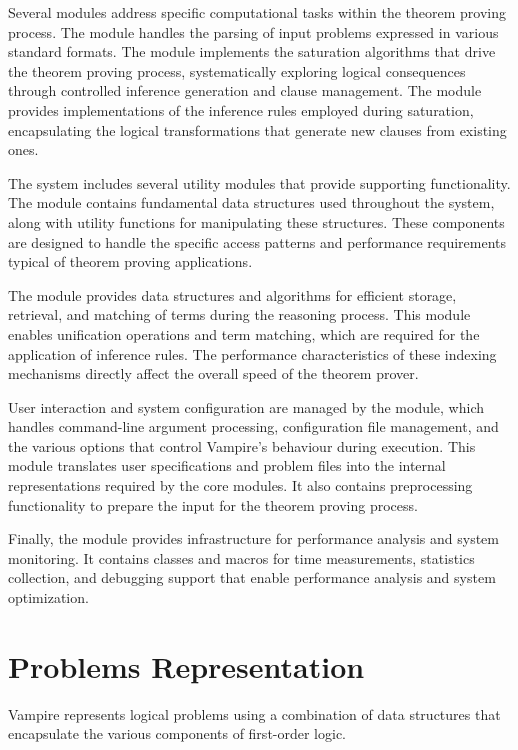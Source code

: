 Several modules address specific computational tasks within the theorem proving process.
The  module handles the parsing of input problems expressed in various standard formats.
The  module implements the saturation algorithms that drive the theorem proving process, systematically exploring logical consequences through controlled inference generation and clause management.
The  module provides implementations of the inference rules employed during saturation, encapsulating the logical transformations that generate new clauses from existing ones.

The system includes several utility modules that provide supporting functionality.
The  module contains fundamental data structures used throughout the system, along with utility functions for manipulating these structures.
These components are designed to handle the specific access patterns and performance requirements typical of theorem proving applications.

The  module provides data structures and algorithms for efficient storage, retrieval, and matching of terms during the reasoning process.
This module enables unification operations and term matching, which are required for the application of inference rules.
The performance characteristics of these indexing mechanisms directly affect the overall speed of the theorem prover.

User interaction and system configuration are managed by the  module, which handles command-line argument processing, configuration file management, and the various options that control Vampire's behaviour during execution.
This module translates user specifications and problem files into the internal representations required by the core modules.
It also contains preprocessing functionality to prepare the input for the theorem proving process.

Finally, the  module provides infrastructure for performance analysis and system monitoring.
It contains classes and macros for time measurements, statistics collection, and debugging support that enable performance analysis and system optimization.

\section{Problems Representation}\label{sec:problems-representation}

Vampire represents logical problems using a combination of data structures that encapsulate the various components of first-order logic.

